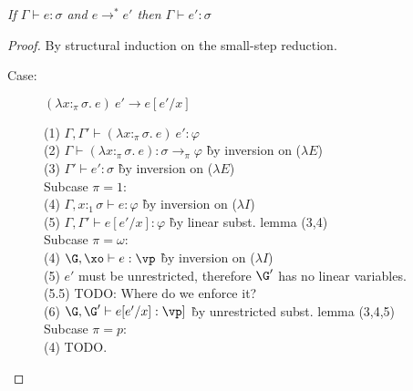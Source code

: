 
\begin{theorem}
\emph{If $\Gamma \vdash e : \sigma$ and $e \to^* e'$ then $\Gamma \vdash e' : \sigma$}
\end{theorem}

\begin{proof}
By structural induction on the small-step reduction.

%

\begin{description}

\item[Case:] $(\lambda x{:}_\pi\sigma.~e)~e' \longrightarrow e[e'/x]$
\begin{tabbing}
    (1) $\Gamma, \Gamma' \vdash (\lambda x{:}_\pi\sigma.~e)~e' : \varphi$\\
    (2) $\Gamma \vdash (\lambda x{:}_\pi\sigma.~e) : \sigma\to_\pi\varphi$ \` by inversion on ($\lambda E$) \\
    (3) $\Gamma' \vdash e' : \sigma$ \` by inversion on ($\lambda E$) \\
    Subcase $\pi = 1$:\\
    (4) $\Gamma, x{:}_1\sigma \vdash e : \varphi$ \` by inversion on ($\lambda I$) \\
    (5) $\Gamma, \Gamma' \vdash e[e'/x] : \varphi$ \` by linear subst. lemma (3,4) \\
    Subcase $\pi = \omega$:\\
    (4) $\G, \xo \vdash e : \vp$ \` by inversion on ($\lambda I$)\\
    (5) $e'$ must be unrestricted, therefore $\G'$ has no linear variables.\\
    (5.5) TODO: Where do we enforce it?\\
    (6) $\G, \G' \vdash e[e'/x] : \vp]$ \` by unrestricted subst. lemma (3,4,5)\\
    Subcase $\pi = p$:\\
    (4) TODO.\\
\end{tabbing}


\end{description}
\end{proof}
